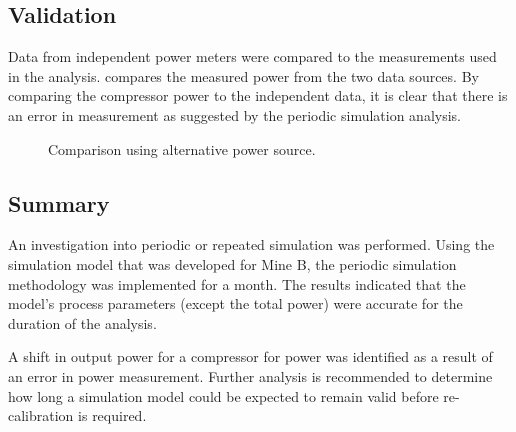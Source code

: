  \subsection{Validation}
Data from independent power meters were compared to the measurements used in the analysis.   compares the measured power from the two data sources. By comparing the compressor power to the independent data, it is clear that there is an error in measurement as suggested by the periodic simulation analysis.
	\begin{figure}[h!]
		\centering
		
		\caption{Comparison using alternative power source.}
		\label{fig: Corrected Periodic simulation}
	\end{figure} 
	
	\subsection{Summary}
	An investigation into periodic or repeated simulation was performed. Using the simulation model that was developed for Mine B, the periodic simulation methodology was implemented for a month. The results indicated that the model's process parameters (except the total power) were accurate for the duration of the analysis.
	\par 
	 A shift in output power for a compressor for power was identified as a result of an error in power measurement. Further analysis is recommended to determine how long a simulation model could be expected to remain valid before re-calibration is required.
	 
